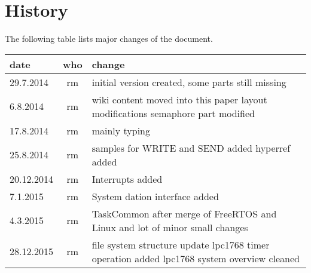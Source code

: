 \chapter*{History}
The following table lists major changes of the document.

\begin{tabular}{|l|c|p{10cm}|}
\hline
date & who & change \\
\hline
29.7.2014 & rm & initial version created, some parts still missing \\
6.8.2014 & rm & wiki content moved into this paper \newline
                layout modifications\newline
                semaphore part modified\\
17.8.2014 & rm & mainly typing \\
25.8.2014 & rm & samples for WRITE and SEND added \newline
		 hyperref added\\
20.12.2014 & rm & Interrupts added \\
7.1.2015 & rm & System dation interface added \\
4.3.2015 & rm &  TaskCommon after merge of FreeRTOS and Linux \newline
and lot of minor small changes \\
28.12.2015 & rm & file system structure update \newline
                  lpc1768 timer operation added \newline
                  lpc1768 system overview cleaned \\
\hline
\end{tabular} 

